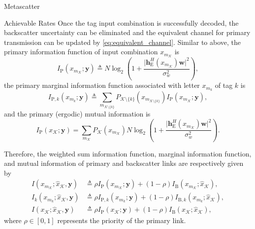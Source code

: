 \documentclass[journal]{IEEEtran}
\begin{document}
\begin{section}{Metascatter}
\begin{subsection}{Achievable Rates}
		Once the tag input combination is successfully decoded, the backscatter uncertainty can be eliminated and the equivalent channel for primary transmission can be updated by \eqref{eq:equivalent_channel}.
		Similar to above, the primary information function of input combination $x_{m_{\mathcal{K}}}$ is
		\begin{equation}
			I_{\mathrm{P}}(x_{m_{\mathcal{K}}};\boldsymbol{y}) \triangleq N \log_2 \left(1 + \frac{\lvert \boldsymbol{h}_{\mathrm{E}}^H(x_{m_{\mathcal{K}}}) \boldsymbol{w} \rvert^2}{\sigma_w^2}\right),
			\label{eq:primary_information_function}
		\end{equation}
		the primary marginal information function associated with letter $x_{m_k}$ of tag $k$ is
		\begin{equation}
			I_{\mathrm{P},k}(x_{m_k};\boldsymbol{y}) \triangleq \sum_{m_{\mathcal{K} \setminus \{k\}}} P_{\mathcal{K} \setminus \{k\}}(x_{m_{\mathcal{K} \setminus \{k\}}}) I_{\mathrm{P}}(x_{m_{\mathcal{K}}};\boldsymbol{y}),
			\label{eq:primary_marginal_information_function}
		\end{equation}
		and the primary (ergodic) mutual information is
		\begin{equation}
			I_{\mathrm{P}}(x_{\mathcal{K}};\boldsymbol{y}) = \sum_{m_{\mathcal{K}}} P_{\mathcal{K}}(x_{m_{\mathcal{K}}}) N \log_2 \left(1 + \frac{\lvert \boldsymbol{h}_{\mathrm{E}}^H(x_{m_{\mathcal{K}}}) \boldsymbol{w} \rvert^2}{\sigma_w^2}\right).
			\label{eq:primary_mutual_information}
		\end{equation}

		Therefore, the weighted sum information function, marginal information function, and mutual information of primary and backscatter links are respectively given by
		\begin{align}
			I(x_{m_{\mathcal{K}}};\hat{x}_{\mathcal{K}},\boldsymbol{y})
			 & \triangleq \rho I_{\mathrm{P}}(x_{m_{\mathcal{K}}};\boldsymbol{y}) + (1 - \rho) I_{\mathrm{B}}(x_{m_{\mathcal{K}}};\hat{x}_{\mathcal{K}}),\label{eq:weighted_sum_information_function} \\
			I_k(x_{m_k};\hat{x}_{\mathcal{K}},\boldsymbol{y})
			 & \triangleq \rho I_{\mathrm{P},k}(x_{m_k};\boldsymbol{y}) + (1 - \rho) I_{\mathrm{B},k}(x_{m_k};\hat{x}_{\mathcal{K}}),\label{eq:weighted_sum_marginal_information}                     \\
			I(x_{\mathcal{K}};\hat{x}_{\mathcal{K}},\boldsymbol{y})
			 & \triangleq \rho I_{\mathrm{P}}(x_{\mathcal{K}};\boldsymbol{y}) + (1 - \rho) I_{\mathrm{B}}(x_{\mathcal{K}};\hat{x}_{\mathcal{K}}),\label{eq:weighted_sum_mutual_information}
		\end{align}
		where $\rho \in [0,1]$ represents the priority of the primary link.
	\end{subsection}
\end{section}
\end{document}
